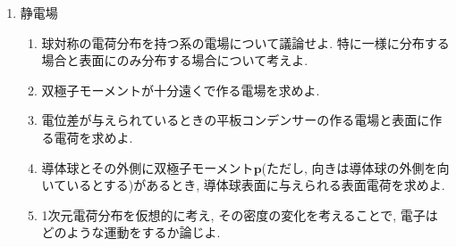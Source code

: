 \documentclass[11pt,a4paper]{jarticle}
\title{}
\author{}
\date{}
\begin{document}
\maketitle
\begin{enumerate}
    \item 静電場
    \begin{enumerate}
        \item 球対称の電荷分布を持つ系の電場について議論せよ. 特に一様に分布する場合と表面にのみ分布する場合について考えよ.
        \item 双極子モーメントが十分遠くで作る電場を求めよ.
        \item 電位差が与えられているときの平板コンデンサーの作る電場と表面に作る電荷を求めよ.
        \item 導体球とその外側に双極子モーメント$\bm{p}$(ただし, 向きは導体球の外側を向いているとする)があるとき, 導体球表面に与えられる表面電荷を求めよ.
        \item 1次元電荷分布を仮想的に考え, その密度の変化を考えることで, 電子はどのような運動をするか論じよ.
    \end{enumerate}
\end{enumerate}
\end{document}
